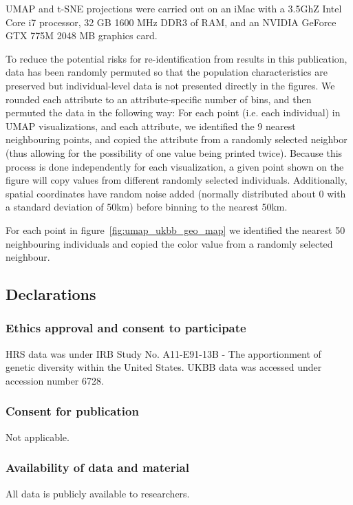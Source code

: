 \documentclass[12pt]{pnas-new}
\begin{document}
{UMAP and t-SNE projections were carried out on an iMac with a 3.5GhZ Intel Core i7 processor, 32 GB 1600 MHz DDR3 of RAM, and an NVIDIA GeForce GTX 775M 2048 MB graphics card.

To reduce the potential risks for re-identification from results in this publication, data has been randomly permuted so that the population characteristics are preserved but individual-level data is not presented directly in the figures. We rounded each attribute to an attribute-specific number of bins, and then permuted the data in the following way: 
For each point (i.e. each individual) in UMAP visualizations, and each attribute, we identified the 9 nearest neighbouring points, and copied the attribute from a randomly selected neighbor (thus allowing for the possibility of one value being printed twice).  Because this process is done independently for each visualization, a given point shown on the figure will copy values from different randomly selected individuals. Additionally, spatial coordinates have random noise added (normally distributed about 0 with a standard deviation of 50km) before binning to the nearest 50km.

For each point in figure~\ref{fig:umap_ukbb_geo_map} we identified the nearest 50 neighbouring individuals and copied the color value from a randomly selected neighbour.}

\showmatmethods{} %



\subsection*{Declarations}
\subsubsection*{Ethics approval and consent to participate}
HRS data was under IRB Study No. A11-E91-13B - The apportionment of genetic diversity within the United States. UKBB data was accessed under accession number 6728.

\subsubsection*{Consent for publication} Not applicable.

\subsubsection*{Availability of data and material} All data is publicly available to researchers.
\end{document}
